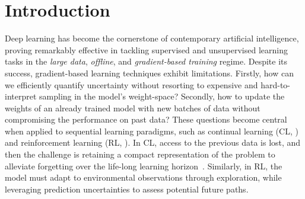 \documentclass{article}
\begin{document}

\section{Introduction}
\label{sec:intro}
%
Deep learning \cite{goodfellow2016deep} has become the cornerstone of contemporary artificial intelligence, proving remarkably effective in tackling supervised and unsupervised learning tasks in the {\em large data}, {\em offline}, and {\em gradient-based training} regime. Despite its success, gradient-based learning techniques exhibit limitations. Firstly, how can we efficiently quantify uncertainty without resorting to expensive and hard-to-interpret sampling in the model's weight-space? Secondly, how to update the weights of an already trained model with new batches of data without compromising the performance on past data? These questions become central when applied to sequential learning paradigms, such as continual learning (CL, \citep{parisi2019continual, de2021continual}) and reinforcement learning (RL, \cite{sutton2018reinforcement}). In CL, access to the previous data is lost, and then the challenge is retaining a compact representation of the problem to alleviate forgetting over the life-long learning horizon~\cite{mccloskey1989catastrophic}. Similarly, in RL, the model must adapt to environmental observations through exploration, while leveraging prediction uncertainties to assess potential future paths.

\end{document}
